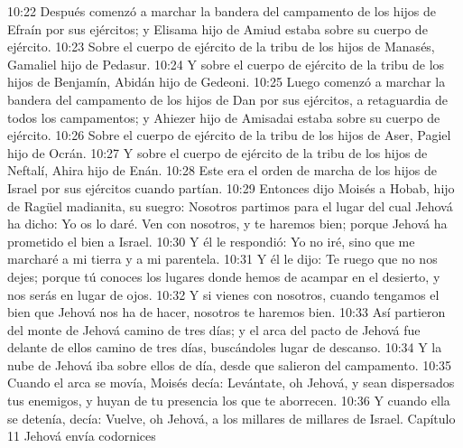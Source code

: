 10:22 Después comenzó a marchar la bandera del campamento de los hijos de Efraín por sus ejércitos; y Elisama hijo de Amiud estaba sobre su cuerpo de ejército.  
10:23 Sobre el cuerpo de ejército de la tribu de los hijos de Manasés, Gamaliel hijo de Pedasur.  
10:24 Y sobre el cuerpo de ejército de la tribu de los hijos de Benjamín, Abidán hijo de Gedeoni.  
10:25 Luego comenzó a marchar la bandera del campamento de los hijos de Dan por sus ejércitos, a retaguardia de todos los campamentos; y Ahiezer hijo de Amisadai estaba sobre su cuerpo de ejército.  
10:26 Sobre el cuerpo de ejército de la tribu de los hijos de Aser, Pagiel hijo de Ocrán.  
10:27 Y sobre el cuerpo de ejército de la tribu de los hijos de Neftalí, Ahira hijo de Enán.  
10:28 Este era el orden de marcha de los hijos de Israel por sus ejércitos cuando partían.  
10:29 Entonces dijo Moisés a Hobab, hijo de Ragüel madianita, su suegro: Nosotros partimos para el lugar del cual Jehová ha dicho: Yo os lo daré. Ven con nosotros, y te haremos bien; porque Jehová ha prometido el bien a Israel.  
10:30 Y él le respondió: Yo no iré, sino que me marcharé a mi tierra y a mi parentela.  
10:31 Y él le dijo: Te ruego que no nos dejes; porque tú conoces los lugares donde hemos de acampar en el desierto, y nos serás en lugar de ojos.  
10:32 Y si vienes con nosotros, cuando tengamos el bien que Jehová nos ha de hacer, nosotros te haremos bien.  
10:33 Así partieron del monte de Jehová camino de tres días; y el arca del pacto de Jehová fue delante de ellos camino de tres días, buscándoles lugar de descanso.  
10:34 Y la nube de Jehová iba sobre ellos de día, desde que salieron del campamento.  
10:35 Cuando el arca se movía, Moisés decía: Levántate, oh Jehová, y sean dispersados tus enemigos, y huyan de tu presencia los que te aborrecen.  
10:36 Y cuando ella se detenía, decía: Vuelve, oh Jehová, a los millares de millares de Israel.  
Capítulo 11 
Jehová envía codornices  

